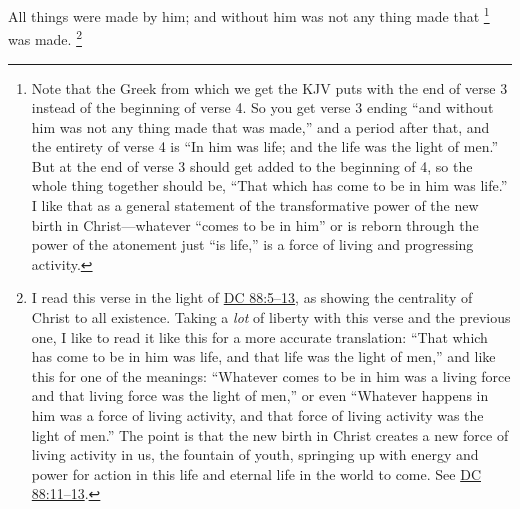 			All things were made by him; and without him was not any thing made that%
				\footnote{%
					Note that the Greek from which we get the KJV puts  with the end of verse 3 instead of the beginning of verse 4. So you get verse 3 ending ``and without him was not any thing made that was made,'' and a period after that, and the entirety of verse 4 is ``In him was life; and the life was the light of men.'' But  at the end of verse 3 should get added to the beginning of 4, so the whole thing together should be, ``That which has come to be in him was life.'' I like that as a general statement of the transformative power of the new birth in Christ---whatever ``comes to be in him'' or is reborn through the power of the atonement just ``is life,'' is a force of living and progressing activity.
					}
			was made.%
				\footnote{%
					I read this verse in the light of \hyperref[DC88-5]{DC 88:5--13}, as showing the centrality of Christ to all existence. Taking a \textit{lot} of liberty with this verse and the previous one, I like to read it like this for a more accurate translation: ``That which has come to be in him was life, and that life was the light of men,'' and like this for one of the meanings: ``Whatever comes to be in him was a living force and that living force was the light of men,'' or even ``Whatever happens in him was a force of living activity, and that force of living activity was the light of men.'' The point is that the new birth in Christ creates a new force of living activity in us, the fountain of youth, springing up with energy and power for action in this life and eternal life in the world to come. See \hyperref[DC88-11]{DC 88:11--13}.
					}

			\begin{framed}
			\scriptsize
				\begin{compactdesc}
					\item[SBLG] 
				\end{compactdesc}
			\end{framed}


